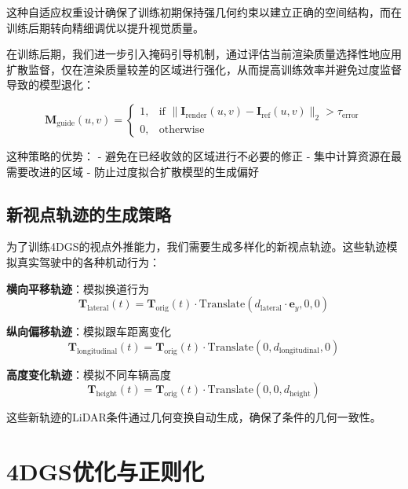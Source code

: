 这种自适应权重设计确保了训练初期保持强几何约束以建立正确的空间结构，而在训练后期转向精细调优以提升视觉质量。

在训练后期，我们进一步引入掩码引导机制，通过评估当前渲染质量选择性地应用扩散监督，仅在渲染质量较差的区域进行强化，从而提高训练效率并避免过度监督导致的模型退化：

\begin{equation}
\mathbf{M}_{\text{guide}}(u,v) = \begin{cases}
1, & \text{if } \|\mathbf{I}_{\text{render}}(u,v) - \mathbf{I}_{\text{ref}}(u,v)\|_2 > \tau_{\text{error}} \\
0, & \text{otherwise}
\end{cases}
\label{eq:masked_guidance}
\end{equation}

这种策略的优势：
- 避免在已经收敛的区域进行不必要的修正
- 集中计算资源在最需要改进的区域
- 防止过度拟合扩散模型的生成偏好

\subsection{新视点轨迹的生成策略}

为了训练4DGS的视点外推能力，我们需要生成多样化的新视点轨迹。这些轨迹模拟真实驾驶中的各种机动行为：

\textbf{横向平移轨迹}：模拟换道行为
\begin{equation}
\mathbf{T}_{\text{lateral}}(t) = \mathbf{T}_{\text{orig}}(t) \cdot \text{Translate}(d_{\text{lateral}} \cdot \mathbf{e}_y, 0, 0)
\label{eq:lateral_trajectory}
\end{equation}

\textbf{纵向偏移轨迹}：模拟跟车距离变化
\begin{equation}
\mathbf{T}_{\text{longitudinal}}(t) = \mathbf{T}_{\text{orig}}(t) \cdot \text{Translate}(0, d_{\text{longitudinal}}, 0)
\label{eq:longitudinal_trajectory}
\end{equation}

\textbf{高度变化轨迹}：模拟不同车辆高度
\begin{equation}
\mathbf{T}_{\text{height}}(t) = \mathbf{T}_{\text{orig}}(t) \cdot \text{Translate}(0, 0, d_{\text{height}})
\label{eq:height_trajectory}
\end{equation}

这些新轨迹的LiDAR条件通过几何变换自动生成，确保了条件的几何一致性。

\section{4DGS优化与正则化}

